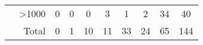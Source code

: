 \begin{table}[]
{\begin{tabular}{lrcccccccc}
                                  & \multicolumn{1}{r|}{\textgreater 1000} & 0                                  & 0                               & 0                               & \cellcolor[HTML]{FFFAF0}3       & \cellcolor[HTML]{FFFDFA}1       & \cellcolor[HTML]{FFFCF5}2       & \multicolumn{1}{c|}{\cellcolor[HTML]{FFC757}34} & \multicolumn{1}{c|}{40}             \\ \cline{2-10}
            \multicolumn{1}{l|}{} & \multicolumn{1}{r|}{Total}             & 0                                  & 1                               & 10                              & 11                              & 33                              & 24                              & \multicolumn{1}{c|}{65                        } & \multicolumn{1}{c|}{144}            \\ \cline{2-10}
        \end{tabular}%
    }
\end{table}
